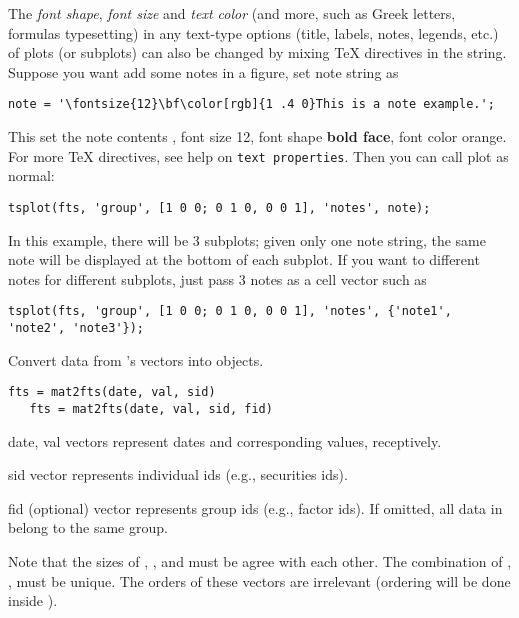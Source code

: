 The \emph{font shape}, \emph{font size} and \emph{text color}
(and more, such as Greek letters, formulas typesetting) in any text-type options 
(title, labels, notes, legends, etc.)
of plots (or subplots) can also be changed 
by mixing \TeX{} directives in the string.
Suppose you want add some notes in a figure, set note string as
\begin{lstlisting}[numbers=none]
   note = '\fontsize{12}\bf\color[rgb]{1 .4 0}This is a note example.';
\end{lstlisting}
This set the note contents , 
{\large{}font size 12}, font shape \textbf{bold face}, font color \textcolor{ingorange}{orange}.
For more \TeX{} directives, see \matlab{} help on \texttt{text properties}.
Then you can call plot as normal:
\begin{lstlisting}[numbers=none]
   tsplot(fts, 'group', [1 0 0; 0 1 0, 0 0 1], 'notes', note);
\end{lstlisting}
In this example, there will be 3 subplots;
given only one note string, the same note
will be displayed at the bottom of each subplot.
If you want to different notes for different subplots,
just pass 3 notes as a cell vector such as
\begin{lstlisting}[numbers=none]
   tsplot(fts, 'group', [1 0 0; 0 1 0, 0 0 1], 'notes', {'note1', 'note2', 'note3'});
\end{lstlisting}


   Convert data from \matlab's vectors into \myfints{} objects.

\usage
   \begin{lstlisting}[numbers=none]
   fts = mat2fts(date, val, sid)
   fts = mat2fts(date, val, sid, fid)
   \end{lstlisting}

\inarg
   \begin{argdesc}
   \item[date, val] vectors represent dates and corresponding values, receptively.
   \item[sid]  vector represents individual ids (e.g., securities ids).
   \item[fid]  (optional) vector represents group ids (e.g., factor ids).
               If omitted, all data in  belong to the same group.
   \end{argdesc}

   Note that the sizes of , ,  and 
   must be agree with each other.
   The combination of , ,  must be unique.
   The orders of these vectors are irrelevant (ordering will be done inside ).
   
